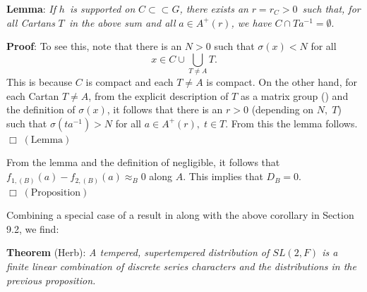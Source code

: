 \documentclass[11pt, a4paper]{article}
\begin{document}
{\bf Lemma}: {\em If }$h${\em \ is supported on }$C\subset \subset G${\em ,
there exists an }$r=r_C>0${\em \ such that, for all Cartans }$T${\em \ in
the above sum and all }$a\in A^{+}(r)${\em , we have }$C\cap Ta^{-1}=\emptyset $.

{\bf Proof}: To see this, note that there is an $N>0$ such that $\sigma
(x)<N$ for all
\[
x\in C\cup \bigcup_{T\neq A}T.
\]
This is because $C$ is compact and each $T\neq A$ is compact. On the other
hand, for each Cartan $T\neq A$, from the explicit description of $T$ as a
matrix group (\cite{SS2}) and the definition of $\sigma (x)$, it follows that
there is an $r>0$ (depending on $N,\;T$) such that $\sigma (ta^{-1})>N$ for all
$a\in A^{+}(r),\;t\in T$. From this the lemma follows. $\Box\;(\text{Lemma})$

From the lemma and the definition of negligible, it follows that
$f_{1,(B)}(a)-f_{2,(B)}(a)\approx _B0$ along $A$. This implies that $D_B=0$.
$\Box\;(\text{Proposition})$

Combining a special case of a result in \cite{H} along with the above corollary
in Section 9.2, we find:

{\bf Theorem} (Herb): {\em A tempered, supertempered distribution of $SL(2,F)$ is
a finite linear combination of discrete series characters and the
distributions in the previous proposition.}
\end{document}
